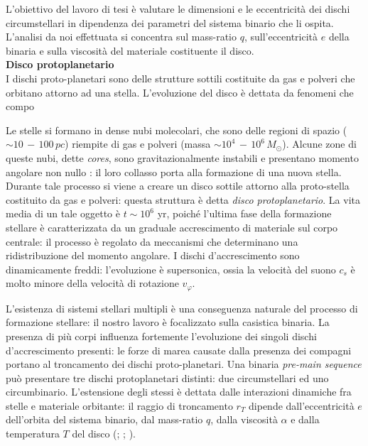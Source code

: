 \documentclass[12pt, a4paper]{report}
\begin{document}
L'obiettivo del lavoro di tesi è valutare le dimensioni e le eccentricità dei dischi circumstellari in dipendenza dei parametri del sistema binario che li ospita.
L'analisi da noi effettuata si concentra sul mass-ratio $q$, sull'eccentricità $e$ della binaria e sulla viscosità del materiale costituente il disco.\\

\textbf{Disco protoplanetario}\\

I dischi proto-planetari sono delle strutture sottili costituite da gas e polveri che orbitano attorno ad una stella.
L'evoluzione del disco è dettata da fenomeni che compo

Le stelle si formano in dense nubi molecolari, che sono delle regioni di spazio ($\sim 10\,-\,100\,pc$) riempite di gas e polveri (massa $\sim 10^4\,-\,10^6\,M_\odot$). 
Alcune zone di queste nubi, dette \textit{cores}, sono gravitazionalmente instabili e presentano momento angolare non nullo \parencite{Goodman1993}: il loro collasso porta alla formazione di una nuova stella. 
Durante tale processo si viene a creare un disco sottile attorno alla proto-stella costituito da gas e polveri: questa struttura è detta \textit{disco protoplanetario}.
La vita media di un tale oggetto è $t \sim 10^6$ yr, poiché l'ultima fase della formazione stellare è caratterizzata da un graduale accrescimento di materiale sul corpo centrale: il processo è regolato da meccanismi che determinano una ridistribuzione del momento angolare.
I dischi d'accrescimento sono dinamicamente freddi: l'evoluzione è supersonica, ossia la velocità del suono $c_s$ è molto minore della velocità di rotazione $v_\varphi$.

L'esistenza di sistemi stellari multipli è una conseguenza naturale del processo di formazione stellare: il nostro lavoro è focalizzato sulla casistica binaria.
La presenza di più corpi influenza fortemente l'evoluzione dei singoli dischi d'accrescimento presenti: le forze di marea causate dalla presenza dei compagni portano al troncamento dei dischi proto-planetari.
Una binaria \textit{pre-main sequence} può presentare tre dischi protoplanetari distinti: due circumstellari ed uno circumbinario.
L'estensione degli stessi è dettata dalle interazioni dinamiche fra stelle e materiale orbitante: il raggio di troncamento $r_T$ dipende dall'eccentricità $e$ dell'orbita del sistema binario, dal mass-ratio $q$, dalla viscosità $\alpha$ e dalla temperatura $T$ del disco (\cite{PapaloizouPringle1977}; \cite{ArtymowiczLubow1994}; \cite{Pichardo2005}).
\end{document}
